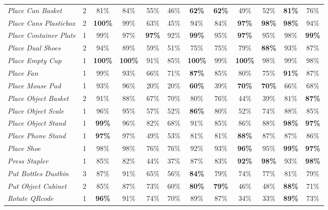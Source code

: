 \documentclass[onecolumn]{robbyant}           %
\begin{document}
\begin{table}[t]
{\begin{tabular}{l c cc cc cc cc cc}
\textit{Place Can Basket} & 2 & 81\% & 84\% & 55\% & 46\% & \textbf{62\%} & \textbf{62\%} & 49\% & 52\% & \textbf{81\%} & 76\% \\
\textit{Place Cans Plasticbox} & 2 & \textbf{100\%} & 99\% & 63\% & 45\% & 94\% & 84\% & \textbf{97\%} & \textbf{98\%} & \textbf{98\%} & 94\% \\
\textit{Place Container Plate} & 1 & 99\% & 97\% & \textbf{97\%} & 92\% & \textbf{99\%} & 95\% & \textbf{97\%} & 95\% & 98\% & \textbf{99\%} \\
\textit{Place Dual Shoes} & 2 & 94\% & 89\% & 59\% & 51\% & 75\% & 75\% & 79\% & \textbf{88\%} & 93\% & 87\% \\
\textit{Place Empty Cup} & 1 & \textbf{100\%} & \textbf{100\%} & 91\% & 85\% & \textbf{100\%} & 99\% & \textbf{100\%} & 98\% & 99\% & 98\% \\
\textit{Place Fan} & 1 & 99\% & 93\% & 66\% & 71\% & \textbf{87\%} & 85\% & 80\% & 75\% & \textbf{91\%} & 87\% \\
\textit{Place Mouse Pad} & 1 & 93\% & 96\% & 20\% & 20\% & \textbf{60\%} & 39\% & \textbf{70\%} & \textbf{70\%} & 66\% & 68\% \\
\textit{Place Object Basket} & 2 & 91\% & 88\% & 67\% & 70\% & 80\% & 76\% & 44\% & 39\% & 81\% & \textbf{87\%} \\
\textit{Place Object Scale} & 1 & 96\% & 95\% & 57\% & 52\% & \textbf{86\%} & 80\% & 52\% & 74\% & 88\% & 85\% \\
\textit{Place Object Stand} & 1 & \textbf{99\%} & 96\% & 82\% & 68\% & 91\% & 85\% & 86\% & 88\% & \textbf{98\%} & \textbf{97\%} \\
\textit{Place Phone Stand} & 1 & \textbf{97\%} & 97\% & 49\% & 53\% & 81\% & 81\% & \textbf{88\%} & 87\% & 87\% & 86\% \\
\textit{Place Shoe} & 1 & 98\% & 98\% & 76\% & 76\% & 92\% & 93\% & \textbf{96\%} & 95\% & \textbf{99\%} & \textbf{97\%} \\
\textit{Press Stapler} & 1 & 85\% & 82\% & 44\% & 37\% & 87\% & 83\% & \textbf{92\%} & \textbf{98\%} & 93\% & \textbf{98\%} \\
\textit{Put Bottles Dustbin} & 3 & 87\% & 91\% & 65\% & 56\% & \textbf{84\%} & 79\% & 74\% & 77\% & 81\% & 79\% \\
\textit{Put Object Cabinet} & 2 & 85\% & 87\% & 73\% & 60\% & \textbf{80\%} & \textbf{79\%} & 46\% & 48\% & \textbf{88\%} & 71\% \\
\textit{Rotate QRcode} & 1 & \textbf{96\%} & 91\% & 74\% & 70\% & 89\% & 87\% & 34\% & 33\% & \textbf{89\%} & 73\% \\

\end{tabular}}
\end{table}
\end{document}
